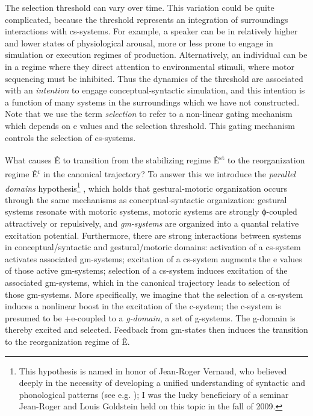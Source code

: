   The selection threshold can vary over time. This variation could be quite complicated, because the threshold represents an integration of surroundings interactions with cs-systems. For example, a speaker can be in relatively higher and lower states of physiological arousal, more or less prone to engage in simulation or execution regimes of production. Alternatively, an individual can be in a regime where they direct attention to environmental stimuli, where motor sequencing must be inhibited. Thus the dynamics of the threshold are associated with an \textit{intention} to engage conceptual-syntactic simulation, and this intention is a function of many systems in the surroundings which we have not constructed. Note that we use the term \textit{selection} to refer to a non-linear gating mechanism which depends on e values and the selection threshold. This gating mechanism controls the selection of cs-systems.

  What causes Ê to transition from the stabilizing regime Ê\textsuperscript{st} to the reorganization regime Ê\textsuperscript{r} in the canonical trajectory? To answer this we introduce the \textit{parallel domains} hypothesis\footnote{This hypothesis is named in honor of Jean-Roger Vernaud, who believed deeply in the necessity of developing a unified understanding of syntactic and phonological patterns (see e.g. \citealt{FreidinVergnaud2001,Vergnaud1977}); I was the lucky beneficiary of a seminar Jean-Roger and Louis Goldstein held on this topic in the fall of 2009.} , which holds that gestural-motoric organization occurs through the same mechanisms as conceptual-syntactic organization: gestural systems resonate with motoric systems, motoric systems are strongly ϕ-coupled attractively or repulsively, and \textit{gm-systems} are organized into a quantal relative excitation potential. Furthermore, there are strong interactions between systems in conceptual/syntactic and gestural/motoric domains: activation of a cs-system activates associated gm-systems; excitation of a cs-system augments the e values of those active gm-systems; selection of a cs-system induces excitation of the associated gm-systems, which in the canonical trajectory leads to selection of those gm-systems. More specifically, we imagine that the selection of a cs-system induces a nonlinear boost in the excitation of the c-system; the c-system is presumed to be +e-coupled to a \textit{g-domain}, a set of g-systems. The g-domain is thereby excited and selected. Feedback from gm-states then induces the transition to the reorganization regime of  Ê.


